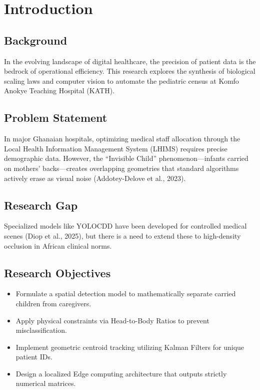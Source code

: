 \chapter{Introduction}

\section{Background}
In the evolving landscape of digital healthcare, the precision of patient data is the bedrock of operational efficiency. This research explores the synthesis of biological scaling laws and computer vision to automate the pediatric census at Komfo Anokye Teaching Hospital (KATH).

\section{Problem Statement}
In major Ghanaian hospitals, optimizing medical staff allocation through the Local Health Information Management System (LHIMS) requires precise demographic data. However, the ``Invisible Child'' phenomenon—infants carried on mothers' backs—creates overlapping geometries that standard algorithms actively erase as visual noise (Addotey-Delove et al., 2023).

\section{Research Gap}
Specialized models like YOLOCDD have been developed for controlled medical scenes (Diop et al., 2025), but there is a need to extend these to high-density occlusion in African clinical norms.

\section{Research Objectives}
\begin{itemize}
    \item Formulate a spatial detection model to mathematically separate carried children from caregivers.
    \item Apply physical constraints via Head-to-Body Ratios to prevent misclassification.
    \item Implement geometric centroid tracking utilizing Kalman Filters for unique patient IDs.
    \item Design a localized Edge computing architecture that outputs strictly numerical matrices.
\end{itemize}
